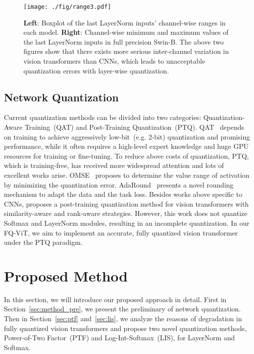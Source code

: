 \documentclass{article}
\begin{document}
\begin{figure*}[t]
\centering
\texttt{[image: ./fig/range3.pdf]}
\caption{\textbf{Left}: Boxplot of the last LayerNorm inputs' channel-wise ranges in each model. \textbf{Right}: Channel-wise minimum and maximum values of the last LayerNorm inputs in full precision Swin-B. The above two figures show that there exists more serious inter-channel variation in vision transformers than CNNs, which leads to unacceptable quantization errors with layer-wise quantization.}
\vskip -0.07in
\label{fig:range}
\end{figure*}

\subsection{Network Quantization}
Current quantization methods can be divided into two categories: Quantization-Aware Training~(QAT) and Post-Training Quantization~(PTQ). QAT~\cite{zhou2016dorefa,jacob2018quantization} depends on training to achieve aggressively low-bit~(e.g. 2-bit) quantization and promising performance, 
while it often requires a high-level expert knowledge and huge GPU resources for training or fine-tuning.
To reduce above costs of quantization, PTQ, which is training-free, has received more widespread attention and lots of excellent works arise. OMSE~\cite{choukroun2019low} proposes to determine the value range of activation by minimizing the quantization error. AdaRound~\cite{nagel2020up} presents a novel rounding mechanism to adapt the data and the task loss. 
Besides works above specific to CNNs, \citeauthor{liu2021post} proposes a post-training quantization method for vision transformers with similarity-aware and rank-aware strategies. However, this work does not quantize Softmax and LayerNorm modules, resulting in an incomplete quantization. In our FQ-ViT, we aim to implement an accurate, fully quantized vision transformer under the PTQ paradigm.

\section{Proposed Method}
In this section, we will introduce our proposed approach in detail. First in Section~\ref{sec:method_pre}, we present the preliminary of network quantization. Then in Section~\ref{sec:ptf} and~\ref{sec:lis}, we analyze the reasons of degradation in fully quantized vision transformers and propose two novel quantization methods, Power-of-Two Factor~(PTF) and Log-Int-Softmax~(LIS), for LayerNorm and Softmax.
\end{document}
